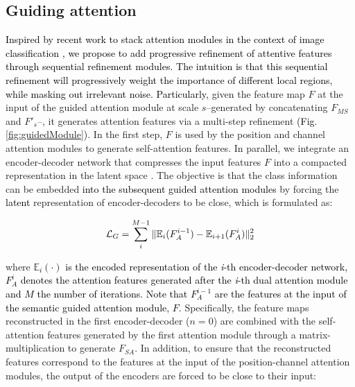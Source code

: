 \documentclass[journal]{IEEEtran}
\begin{document}
\subsection{Guiding attention}
\label{ssec:guide}
\textcolor{black}{Inspired by recent work to stack attention modules in the context of image classification \cite{ji2018stacked}, we propose to add progressive refinement of attentive features through sequential refinement modules. The intuition is that this sequential refinement will progressively weight the importance of different local regions, while masking out irrelevant noise. Particularly,} given the feature map $F$ at the input of the guided attention module at scale $s$--generated by concatenating $F_{MS}$ and $F'_{s}$--, it generates attention features via a multi-step refinement \textcolor{black}{(Fig. \ref{fig:guidedModule})}. In the first step, $F$ is used by the position and channel attention modules to generate self-attention features. In parallel, we integrate an encoder-decoder network that compresses the input features $F$ into a compacted representation in the latent space \textcolor{black}{\cite{ji2018stacked}}. The objective is that the class information can be embedded \textcolor{black}{into the subsequent guided attention modules} by forcing the \textcolor{black}{latent} representation of encoder-decoders to be close, which is formulated as:



\begin{equation}
    \textcolor{black}{\mathcal{L}_{G} = \sum_{i}^{M-1} \|\mathbb{E}_i(F_{A}^{i-1})-\mathbb{E}_{i+1}(F_{A}^i)\|_2^2}
\end{equation}

where \textcolor{black}{$\mathbb{E}_i(\cdot)$ is the encoded representation of the \textit{i}-th encoder-decoder network, $F_{A}^i$ denotes the attention features generated after the \textit{i}-th dual attention module and $M$ the number of iterations. Note that $F_{A}^{i-1}$ are the features at the input of the semantic guided attention module, $F$.} Specifically, the feature maps reconstructed in the first encoder-decoder ($n=0$) are combined with the self-attention features generated by the first attention module through a matrix-multiplication to generate $F_{SA}$. In addition, to ensure that the reconstructed features correspond to the features at the input of the position-channel attention modules, the output of the encoders are forced to be close to their input: 
\end{document}
